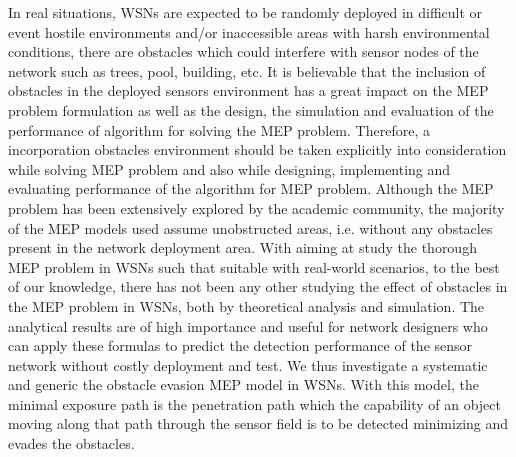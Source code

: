 \documentclass[final]{elsarticle}
\begin{document}
In real situations, WSNs are expected to be randomly deployed in difficult or event hostile environments and/or inaccessible areas with harsh environmental conditions, there are obstacles which could interfere with sensor nodes of the network such as trees, pool, building, etc. It is believable that the inclusion of obstacles in the deployed sensors environment has a great impact on the MEP problem formulation as well as the design, the simulation and evaluation of the performance of algorithm for solving the MEP problem. Therefore, a incorporation obstacles environment should be taken explicitly into consideration while solving MEP problem and also while designing, implementing and evaluating performance of the algorithm for MEP problem. Although the MEP problem has been extensively explored by the academic community, the majority of the MEP models used assume unobstructed areas, i.e. without any obstacles present in the network deployment area. With aiming at study the thorough MEP problem in WSNs such that suitable with real-world scenarios, to the best of our knowledge, there has not been any other studying the effect of obstacles in the MEP problem in WSNs, both by theoretical analysis and simulation. The analytical results are of high importance and useful for network designers who can apply these formulas to predict the detection performance of the sensor network without costly deployment and test. We thus investigate a systematic and generic the obstacle evasion MEP model in WSNs. With this model, the minimal exposure path is the penetration path which the capability of an object moving along that path through the sensor field is to be detected minimizing and evades the obstacles. 
\end{document}
